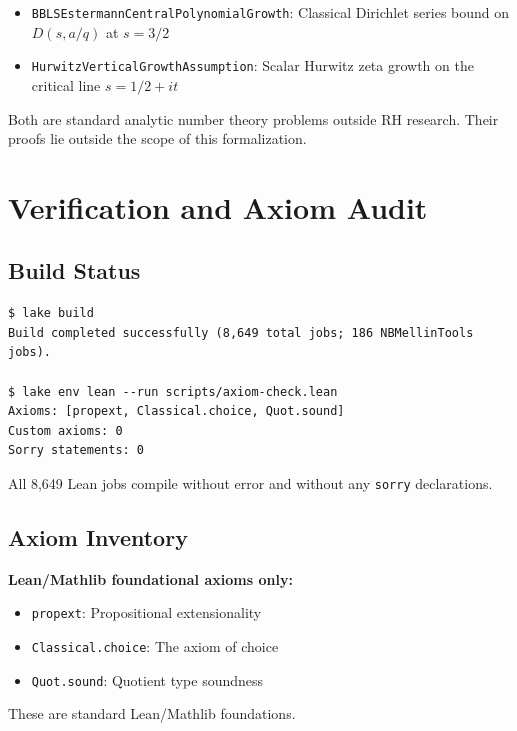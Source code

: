 \documentclass[11pt,a4paper]{article}
\theoremstyle{plain}
\theoremstyle{definition}
\theoremstyle{remark}
\begin{document}
\begin{itemize}[leftmargin=2em]
  \item \texttt{BBLSEstermannCentralPolynomialGrowth}: Classical Dirichlet series bound on $D(s, a/q)$ at $s = 3/2$
  \item \texttt{HurwitzVerticalGrowthAssumption}: Scalar Hurwitz zeta growth on the critical line $s = 1/2 + it$
\end{itemize}

Both are standard analytic number theory problems outside RH research. Their proofs lie outside the scope of this formalization.

\section{Verification and Axiom Audit}
\label{sec:verification}

\subsection{Build Status}

\begin{verbatim}
$ lake build
Build completed successfully (8,649 total jobs; 186 NBMellinTools jobs).

$ lake env lean --run scripts/axiom-check.lean
Axioms: [propext, Classical.choice, Quot.sound]
Custom axioms: 0
Sorry statements: 0
\end{verbatim}

All 8,649 Lean jobs compile without error and without any \texttt{sorry} declarations.

\subsection{Axiom Inventory}

\textbf{Lean/Mathlib foundational axioms only:}
\begin{itemize}[leftmargin=2em]
  \item \texttt{propext}: Propositional extensionality
  \item \texttt{Classical.choice}: The axiom of choice
  \item \texttt{Quot.sound}: Quotient type soundness
\end{itemize}

These are standard Lean/Mathlib foundations.
\end{document}
